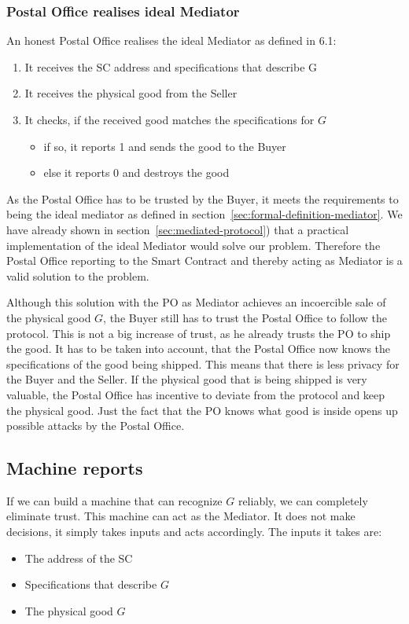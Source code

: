 \documentclass{cacthesis}
\begin{document}
\subsubsection{Postal Office realises ideal Mediator}
An honest Postal Office realises the ideal Mediator as defined in 6.1:
\begin{enumerate}
    \item It receives the SC address and specifications that describe G
    \item It receives the physical good from the Seller
    \item It checks, if the received good matches the specifications for $G$
        \begin{itemize}
            \item if so, it reports 1 and sends the good to the Buyer
            \item else it reports 0 and destroys the good
        \end{itemize}
\end{enumerate}
As the Postal Office has to be trusted by the Buyer, it meets the requirements to being the ideal mediator as defined in section~\ref{sec:formal-definition-mediator}. We have already shown in section~\ref{sec:mediated-protocol}) that a practical implementation of the ideal Mediator would solve our problem. Therefore the Postal Office reporting to the Smart Contract and thereby acting as Mediator is a valid solution to the problem.\newline

Although this solution with the PO as Mediator achieves an incoercible sale of the physical good $G$, the Buyer still has to trust the Postal Office to follow the protocol. This is not a big increase of trust, as he already trusts the PO to ship the good. 
It has to be taken into account, that the Postal Office now knows the specifications of the good being shipped. This means that there is less privacy for the Buyer and the Seller. If the physical good that is being shipped is very valuable, the Postal Office has incentive to deviate from the protocol and keep the physical good. Just the fact that the PO knows what good is inside opens up possible attacks by the Postal Office.\newline


\subsection{Machine reports}
\label{sec:machine-reporst}
If we can build a machine that can recognize $G$ reliably, we can completely eliminate trust. This machine can act as the Mediator. It does not make decisions, it simply takes inputs and acts accordingly.\newline
The inputs it takes are:
\begin{itemize}
    \item The address of the SC
    \item Specifications that describe $G$
    \item The physical good $G$\newline
\end{itemize}
\end{document}

